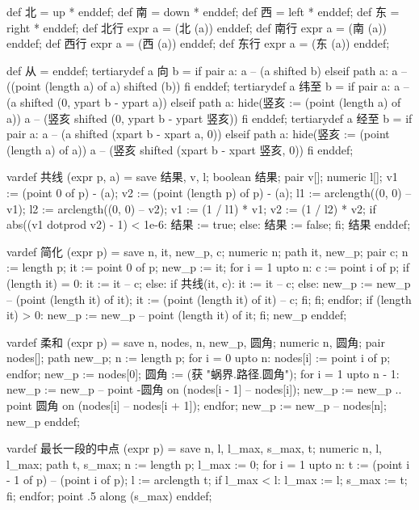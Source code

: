 \startMPinclusions[+]
def 北 = up * enddef; def 南 = down * enddef;
def 西 = left * enddef; def 东 = right * enddef;
def 北行 expr a = (北 (a)) enddef;
def 南行 expr a = (南 (a)) enddef;
def 西行 expr a = (西 (a)) enddef;
def 东行 expr a = (东 (a)) enddef;

def 从 = enddef;
tertiarydef a 向 b =
  if pair a:
    a -- (a shifted b)
  elseif path a:
    a -- ((point (length a) of a) shifted (b))
  fi
enddef;
tertiarydef a 纬至 b = 
  if pair a:
    a -- (a shifted (0, ypart b - ypart a))
  elseif path a:
    hide(竖亥 := (point (length a) of a))
    a -- (竖亥 shifted (0, ypart b - ypart 竖亥))
  fi
enddef;
tertiarydef a 经至 b = 
  if pair a:
    a -- (a shifted (xpart b - xpart a, 0))
  elseif path a:
    hide(竖亥 := (point (length a) of a))
    a -- (竖亥 shifted (xpart b - xpart 竖亥, 0))
  fi
enddef;
\stopMPinclusions

\startMPinclusions[+]
vardef 共线 (expr p, a) =
  save 结果, v, l; boolean 结果; pair v[]; numeric l[];
  v1 := (point 0 of p) - (a);
  v2 := (point (length p) of p) - (a);
  l1 := arclength((0, 0) -- v1); %
  l2 := arclength((0, 0) -- v2); %
  v1 := (1 / l1) * v1; v2 := (1 / l2) * v2;
  if abs((v1 dotprod v2) - 1) < 1e-6:
     结果 := true;
  else:
    结果 := false;
  fi;
  结果
enddef;

vardef 简化 (expr p) =
  save n, it, new_p, c;
  numeric n; path it, new_p; pair c;
  n := length p;
  it := point 0 of p;
  new_p := it;
  for i = 1 upto n:
    c := point i of p;
    if (length it) = 0: 
      it := it -- c;
    else:
      if 共线(it, c):
        it := it -- c;
      else:
        new_p := new_p -- (point (length it) of it);
        it := (point (length it) of it) -- c;
      fi;
    fi;
  endfor;
  if (length it) > 0:
    new_p := new_p -- point (length it) of it;
  fi;
  new_p
enddef;

vardef 柔和 (expr p) =
  save n, nodes, n, new_p, 圆角; 
  numeric n, 圆角; pair nodes[]; path new_p;
  n := length p;
  for i = 0 upto n:
    nodes[i] := point i of p;
  endfor;
  new_p := nodes[0];
  圆角 := (获 "蜗界.路径.圆角");
  for i = 1 upto n - 1:
    new_p := new_p -- point -圆角 on (nodes[i - 1] -- nodes[i]);
    new_p := new_p .. point 圆角 on (nodes[i] -- nodes[i + 1]);
  endfor;
  new_p := new_p -- nodes[n];
  new_p
enddef;
\stopMPinclusions

\startMPinclusions[+]
vardef 最长一段的中点 (expr p) =
  save n, l, l_max, s_max, t;
  numeric n, l, l_max; path t, s_max;
  n := length p;
  l_max := 0;
  for i = 1 upto n:
    t := (point i - 1 of p) -- (point i of p);
    l := arclength t;
    if l_max < l:
      l_max := l; s_max := t;
    fi;
  endfor;
  point .5 along (s_max)
enddef;

